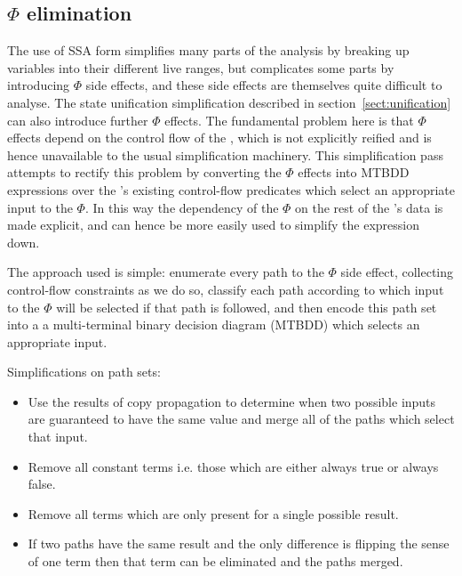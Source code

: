 \subsection{$\Phi$ elimination}
\label{sect:phi_elimination}

The use of SSA form simplifies many parts of the analysis by breaking
up variables into their different live ranges, but complicates some
parts by introducing $\Phi$ side effects, and these side effects are
themselves quite difficult to analyse.  The state unification
simplification described in section~\ref{sect:unification} can also
introduce further $\Phi$ effects.  The fundamental problem here is
that $\Phi$ effects depend on the control flow of the {\StateMachine},
which is not explicitly reified and is hence unavailable to the usual
simplification machinery.  This simplification pass attempts to
rectify this problem by converting the $\Phi$ effects into
MTBDD\needCite{} expressions over the {\StateMachine}'s existing
control-flow predicates which select an appropriate input to the
$\Phi$.  In this way the dependency of the $\Phi$ on the rest of the
{\StateMachine}'s data is made explicit, and can hence be more easily
used to simplify the expression down.



The approach used is simple: enumerate every path to the $\Phi$ side
effect, collecting control-flow constraints as we do so, classify each
path according to which input to the $\Phi$ will be selected if that
path is followed, and then encode this path set into a a
multi-terminal binary decision diagram (MTBDD)\needCite{} which
selects an appropriate input.

Simplifications on path sets:

\begin{itemize}
\item
  Use the results of copy propagation to determine when two possible
  inputs are guaranteed to have the same value and merge all of the
  paths which select that input.
\item
  Remove all constant terms i.e. those which are either always true
  or always false.
\item
  Remove all terms which are only present for a single possible result.
\item
  If two paths have the same result and the only difference is
  flipping the sense of one term then that term can be eliminated
  and the paths merged.
\end{itemize}

